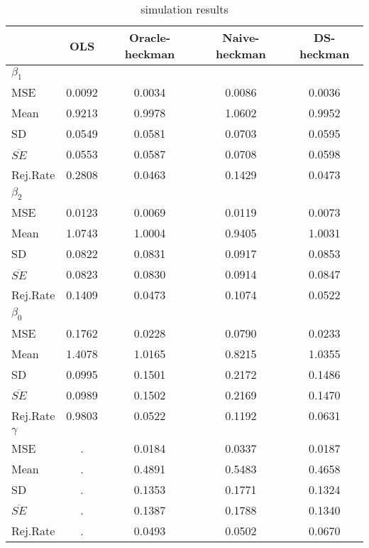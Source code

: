 
\begin{table}[H] \centering
\caption{simulation results}
\begin{tabular}{l|cccc} \hline
&OLS&Oracle-heckman&Naive-heckman&DS-heckman\\ \hline
$\beta_1$\\
MSE&     0.0092&     0.0034&     0.0086&     0.0036\\
Mean&     0.9213&     0.9978&     1.0602&     0.9952\\
SD&     0.0549&     0.0581&     0.0703&     0.0595\\
$\overline{SE}$&     0.0553&     0.0587&     0.0708&     0.0598\\
Rej.Rate&     0.2808&     0.0463&     0.1429&     0.0473\\\hline
$\beta_2$\\
MSE&     0.0123&     0.0069&     0.0119&     0.0073\\
Mean&     1.0743&     1.0004&     0.9405&     1.0031\\
SD&     0.0822&     0.0831&     0.0917&     0.0853\\
$\overline{SE}$&     0.0823&     0.0830&     0.0914&     0.0847\\
Rej.Rate&     0.1409&     0.0473&     0.1074&     0.0522\\\hline
$\beta_0$\\
MSE&     0.1762&     0.0228&     0.0790&     0.0233\\
Mean&     1.4078&     1.0165&     0.8215&     1.0355\\
SD&     0.0995&     0.1501&     0.2172&     0.1486\\
$\overline{SE}$&     0.0989&     0.1502&     0.2169&     0.1470\\
Rej.Rate&     0.9803&     0.0522&     0.1192&     0.0631\\\hline
$\gamma$\\
MSE&          .&     0.0184&     0.0337&     0.0187\\
Mean&          .&     0.4891&     0.5483&     0.4658\\
SD&          .&     0.1353&     0.1771&     0.1324\\
$\overline{SE}$&          .&     0.1387&     0.1788&     0.1340\\
Rej.Rate&          .&     0.0493&     0.0502&     0.0670\\\hline
\end{tabular}
\label{tab:res1}
\end{table}
